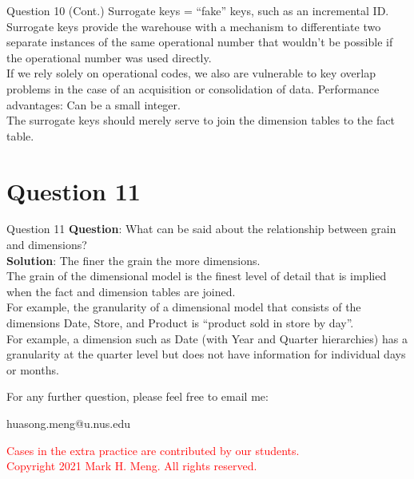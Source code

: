 \begin{frame}[fragile]{Question 10 (Cont.)}
	Surrogate keys = ``fake'' keys, such as an incremental ID.\\\vspace{5pt}
	Surrogate keys provide the warehouse with a mechanism to differentiate two separate instances of the same operational number that wouldn't be possible if the operational number was used directly.\\\vspace{5pt}
	If we rely solely on operational codes, we also are vulnerable to key overlap problems in the case of an acquisition or consolidation of data.
	Performance advantages: Can be a small integer.\\\vspace{5pt}
	The surrogate keys should merely serve to join the dimension tables to the fact table.
\end{frame}

\section*{Question 11}

\begin{frame}[fragile]{Question 11}
	\textbf{Question}: What can be said about the relationship between grain and dimensions? \\\vspace{10pt}	
	\textbf{Solution}: The finer the grain the more dimensions.\\\vspace{5pt}
	The grain of the dimensional model is the finest level of detail that is implied when the fact and dimension tables are joined.\\\vspace{5pt}
	For example, the granularity of a dimensional model that consists of the dimensions Date, Store, and Product is ``product sold in store by day''.\\\vspace{5pt}
	For example, a dimension such as Date (with Year and Quarter hierarchies) has a granularity at the quarter level but does not have information for individual days or months.	
\end{frame}

\begin{frame}[fragile]{}
	\centering  
	For any further question, please feel free to email me:\vspace{10pt}
	
	huasong.meng@u.nus.edu \vspace{20pt}
	
	\begin{tcolorbox}
		\begin{center}
			\textcolor{red}{Cases in the extra practice are contributed by our students.\\\vspace{5pt}Copyright 2021 Mark H. Meng. All rights reserved.}
		\end{center}
	\end{tcolorbox}
\end{frame}
